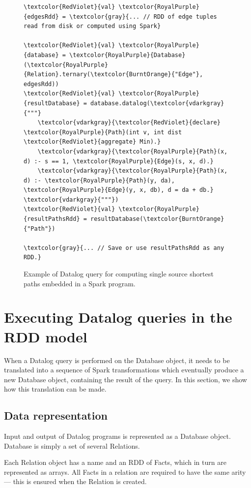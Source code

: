 \begin{figure}[!htbp]
  \centering
\begin{Verbatim}
\textcolor{RedViolet}{val} \textcolor{RoyalPurple}{edgesRdd} = \textcolor{gray}{... // RDD of edge tuples read from disk or computed using Spark}

\textcolor{RedViolet}{val} \textcolor{RoyalPurple}{database} = \textcolor{RoyalPurple}{Database}(\textcolor{RoyalPurple}{Relation}.ternary(\textcolor{BurntOrange}{"Edge"}, edgesRdd))
\textcolor{RedViolet}{val} \textcolor{RoyalPurple}{resultDatabase} = database.datalog(\textcolor{vdarkgray}{"""}
    \textcolor{vdarkgray}{\textcolor{RedViolet}{declare} \textcolor{RoyalPurple}{Path}(int v, int dist \textcolor{RedViolet}{aggregate} Min).}
    \textcolor{vdarkgray}{\textcolor{RoyalPurple}{Path}(x, d) :- s == 1, \textcolor{RoyalPurple}{Edge}(s, x, d).}
    \textcolor{vdarkgray}{\textcolor{RoyalPurple}{Path}(x, d) :- \textcolor{RoyalPurple}{Path}(y, da), \textcolor{RoyalPurple}{Edge}(y, x, db), d = da + db.}
\textcolor{vdarkgray}{"""})
\textcolor{RedViolet}{val} \textcolor{RoyalPurple}{resultPathsRdd} = resultDatabase(\textcolor{BurntOrange}{"Path"})

\textcolor{gray}{... // Save or use resultPathsRdd as any RDD.}
\end{Verbatim}
  \caption{Example of Datalog query for computing single source shortest paths embedded in a Spark program.\label{sdinspark}}
\end{figure}
\section{Executing Datalog queries in the RDD model}

When a Datalog query is performed on the Database object, it needs to be translated into a sequence of Spark transformations which eventually produce a new Database object, containing the result of the query. In this section, we show how this translation can be made.

\subsection{Data representation}

Input and output of Datalog programs is represented as a Database object. Database is simply a set of several Relations.

Each Relation object has a name and an RDD of Facts, which in turn are represented as arrays. All Facts in a relation are required to have the same arity --- this is ensured when the Relation is created.

